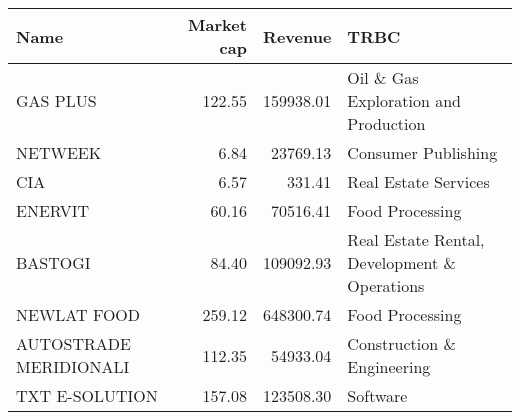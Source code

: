 \begin{tabular}{lrrl}
\toprule
                  Name &  Market cap &   Revenue &                                         TRBC \\
\midrule
              GAS PLUS &      122.55 & 159938.01 &         Oil \& Gas Exploration and Production \\
               NETWEEK &        6.84 &  23769.13 &                          Consumer Publishing \\
                   CIA &        6.57 &    331.41 &                         Real Estate Services \\
               ENERVIT &       60.16 &  70516.41 &                              Food Processing \\
               BASTOGI &       84.40 & 109092.93 & Real Estate Rental, Development \& Operations \\
           NEWLAT FOOD &      259.12 & 648300.74 &                              Food Processing \\
AUTOSTRADE MERIDIONALI &      112.35 &  54933.04 &                   Construction \& Engineering \\
        TXT E-SOLUTION &      157.08 & 123508.30 &                                     Software \\
\bottomrule
\end{tabular}
